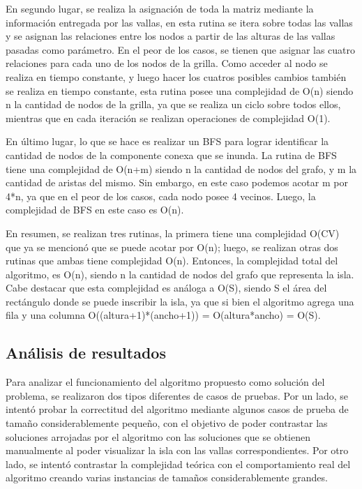 \documentclass[a4paper, 12pt]{article}
\begin{document}
En segundo lugar, se realiza la asignaci\'on de toda la matriz mediante la información entregada por las vallas, en esta rutina se itera sobre todas las vallas y se asignan las relaciones entre los nodos a partir de las alturas de las vallas pasadas como parámetro. En el peor de los casos, se tienen que asignar las cuatro relaciones para cada uno de los nodos de la grilla. Como acceder al nodo se realiza en tiempo constante, y luego hacer los cuatros posibles cambios también se realiza en tiempo constante, esta rutina posee una complejidad de O(n) siendo n la cantidad de nodos de la grilla, ya que se realiza un ciclo sobre todos ellos, mientras que en cada iteración se realizan operaciones de complejidad O(1).

En último lugar, lo que se hace es realizar un BFS para lograr identificar la cantidad de nodos de la componente conexa que se inunda. La rutina de BFS tiene una complejidad de O(n+m) siendo n la cantidad de nodos del grafo, y m la cantidad de aristas del mismo. Sin embargo, en este caso podemos acotar m por 4*n, ya que en el peor de los casos, cada nodo posee 4 vecinos. Luego, la complejidad de BFS en este caso es O(n).

En resumen, se realizan tres rutinas, la primera tiene una complejidad O(CV) que ya se mencionó que se puede acotar por O(n); luego, se realizan otras dos rutinas que ambas tiene complejidad O(n). Entonces, la complejidad total del algoritmo, es O(n), siendo n la cantidad de nodos del grafo que representa la isla. Cabe destacar que esta complejidad es análoga a O(S), siendo S el área del rectángulo donde se puede inscribir la isla, ya que si bien el algoritmo agrega una fila y una columna O((altura+1)*(ancho+1)) = O(altura*ancho) = O(S).

\subsection*{Análisis de resultados}
Para analizar el funcionamiento del algoritmo propuesto como solución del problema, se realizaron dos tipos diferentes de casos de pruebas. Por un lado, se intentó probar la correctitud del algoritmo mediante algunos casos de prueba de tama\~{n}o considerablemente peque\~{n}o, con el objetivo de poder contrastar las soluciones arrojadas por el algoritmo con las soluciones que se obtienen manualmente al poder visualizar la isla con las vallas correspondientes. Por otro lado, se intentó contrastar la complejidad teórica con el comportamiento real del algoritmo creando varias instancias de tama\~{n}os considerablemente grandes.
\end{document}
